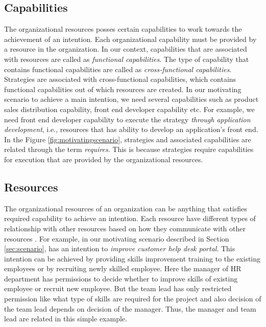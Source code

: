 \subsection{Capabilities}
\label{sec:capabilities}
The organizational resources posses certain capabilities to work towards the achievement of an intention. Each organizational capability must be provided by a resource in the organization. In our context, capabilities that are associated with resources are called as \textit{functional capabilities}. The type of capability that contains functional capabilities are called as \textit{cross-functional capabilities}. Strategies are associated with cross-functional capabilities, which contains functional capabilities out of which resources are created. In our motivating scenario to achieve a main intention, we need several capabilities such as product sales distribution capability, front end developer capability etc. For example, we need front end developer capability to execute the strategy \textit{through application development}, i.e., resources that has ability to develop an application's front end. In the Figure \ref{fig:motivatingscenario}, strategies and associated capabilities are related through the term \textit{requires}. This is because strategies require capabilities for execution that are provided by the organizational resources. 

\subsection{Resources} 
\label{sec:resources}
The organizational resources of an organization can be anything that satisfies required capability to achieve an intention. Each resource have different types of relationship with other resources based on how they communicate with other resources \cite{Sungur2015}. For example, in our motivating scenario described in Section \ref{sec:scenario}, has an intention to \textit{improve customer help desk portal}. This intention can be achieved by providing skills improvement training to the existing employees or by recruiting newly skilled employee. Here the manager of HR department has permissions to decide whether to improve skills of existing employee or recruit new employee. But the team lead has only restricted permission like what type of skills are required for the project and also decision of the team lead depends on decision of the manager. Thus, the manager and team lead are related in this simple example. 
